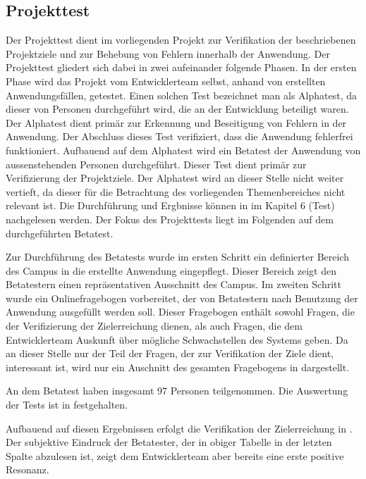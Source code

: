 \subsection{Projekttest}
\label{sec:Projekttest}

Der Projekttest dient im vorliegenden Projekt zur Verifikation der beschriebenen
Projektziele und zur Behebung von Fehlern innerhalb der Anwendung. Der
Projekttest gliedert sich dabei in zwei aufeinander folgende Phasen. In der
ersten Phase wird das Projekt vom Entwicklerteam selbst, anhand von erstellten
Anwendungsfällen, getestet. Einen solchen Test bezeichnet man als Alphatest, da
dieser von Personen durchgeführt wird, die an der Entwicklung beteiligt waren.
Der Alphatest dient primär zur Erkennung und Beseitigung von Fehlern in der
Anwendung. Der Abschluss dieses Test verifiziert, dass die Anwendung fehlerfrei
funktioniert. Aufbauend auf dem Alphatest wird ein Betatest der Anwendung von
aussenstehenden Personen durchgeführt. Dieser Test dient primär zur
Verifizierung der Projektziele. Der Alphatest wird an dieser Stelle nicht weiter
vertieft, da dieser für die Betrachtung des vorliegenden Themenbereiches nicht
relevant ist. Die Durchführung und Ergbnisse können in
\citet{modelierungUndBetrieb2014} im Kapitel 6 (Test) nachgelesen werden. Der
Fokus des Projekttests liegt im Folgenden auf dem durchgeführten Betatest.

Zur Durchführung des Betatests wurde im ersten Schritt ein definierter Bereich
des Campus in die erstellte Anwendung eingepflegt. Dieser Bereich zeigt den
Betatestern einen repräsentativen Ausschnitt des Campus.
Im zweiten Schritt wurde ein Onlinefragebogen vorbereitet, der von Betatestern
nach Benutzung der Anwendung ausgefüllt werden soll. Dieser Fragebogen enthält 
sowohl Fragen, die der Verifizierung der Zielerreichung dienen, als auch
Fragen, die dem Entwicklerteam Auskunft über mögliche Schwachstellen des Systems geben.
Da an dieser Stelle nur der Teil der Fragen, der zur Verifikation der Ziele dient,
interessant ist, wird nur ein Auschnitt des gesamten Fragebogens in  dargestellt.

An dem Betatest haben insgesamt 97 Personen teilgenommen. Die Auswertung der
Tests ist in  festgehalten.

\clearpage
{}

Aufbauend auf diesen Ergebnissen erfolgt die Verifikation der Zielerreichung in .
Der subjektive Eindruck der Betatester, der in obiger Tabelle in der letzten Spalte abzulesen ist,
zeigt dem Entwicklerteam aber bereits eine erste positive Resonanz.